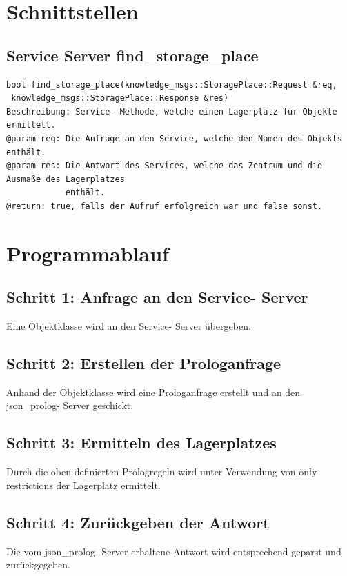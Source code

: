 \documentclass{suturo}
\begin{document}
\section*{Schnittstellen}

\subsection*{Service Server find\_storage\_place}
\begin{verbatim}
bool find_storage_place(knowledge_msgs::StoragePlace::Request &req,
 knowledge_msgs::StoragePlace::Response &res)
Beschreibung: Service- Methode, welche einen Lagerplatz für Objekte ermittelt.
@param req: Die Anfrage an den Service, welche den Namen des Objekts enthält.  
@param res: Die Antwort des Services, welche das Zentrum und die Ausmaße des Lagerplatzes
            enthält.
@return: true, falls der Aufruf erfolgreich war und false sonst.
\end{verbatim}\label{func:findcluster}

\section*{Programmablauf}
\subsection*{Schritt 1: Anfrage an den Service- Server}
Eine Objektklasse wird an den Service- Server übergeben.
\subsection*{Schritt 2: Erstellen der Prologanfrage}
Anhand der Objektklasse wird eine Prologanfrage erstellt und an den json\_prolog- Server geschickt.
\subsection*{Schritt 3: Ermitteln des Lagerplatzes} 
Durch die oben definierten Prologregeln wird unter Verwendung von only- restrictions der Lagerplatz ermittelt.

\subsection*{Schritt 4: Zurückgeben der Antwort}
Die vom json\_prolog- Server erhaltene Antwort wird entsprechend geparst und zurückgegeben.
\end{document}
